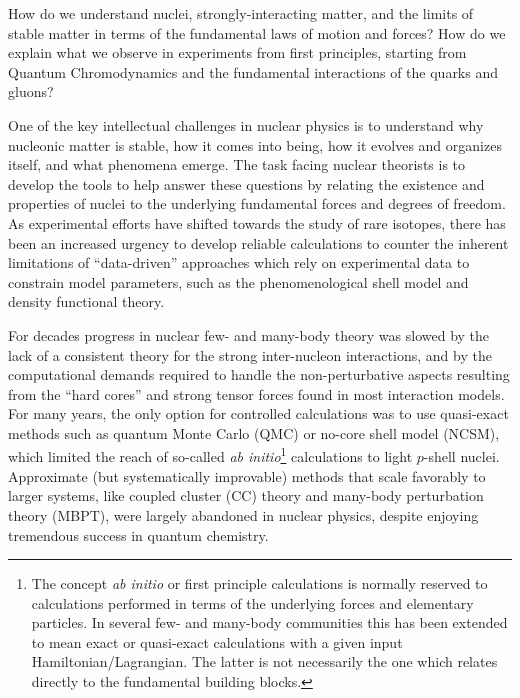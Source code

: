 \documentclass[10pt]{article}
\begin{document}
How do we understand nuclei, strongly-interacting matter, and the limits of
stable matter in terms of the fundamental laws of motion and
forces?  How do we explain what we observe in experiments from first principles,
starting from Quantum Chromodynamics and the fundamental interactions of the quarks and gluons?

One of the key intellectual challenges in nuclear physics is to understand
why nucleonic matter is stable, how it comes into being, how it
evolves and organizes itself, and what phenomena emerge. The task
facing nuclear theorists is to develop the tools to help answer these
questions by relating the existence and properties of nuclei to the
underlying fundamental forces and degrees of freedom. As experimental
efforts have shifted towards the study of rare
isotopes, there
has been an increased urgency to develop reliable 
calculations to counter the inherent limitations of ``data-driven''
approaches which rely on experimental data to constrain model
parameters, such as the phenomenological shell model and density
functional theory. 

For decades progress in nuclear few- and many-body theory was slowed
by the lack of a consistent theory for the strong inter-nucleon
interactions, and by the computational demands required to handle the
non-perturbative aspects resulting from the ``hard cores'' and strong
tensor forces found in most interaction models.  For many years, the
only option for controlled calculations was to use quasi-exact methods
such as quantum Monte Carlo (QMC) or no-core shell model (NCSM), which
limited the reach of so-called \emph{ab initio}\footnote{The concept
  \emph{ab initio} or first principle calculations is normally
  reserved to calculations performed in terms of the underlying forces
  and elementary particles. In several few- and many-body communities
  this has been extended to mean exact or quasi-exact calculations
  with a given input Hamiltonian/Lagrangian. The latter is not
  necessarily the one which relates directly to the fundamental
  building blocks.} calculations to light $p$-shell nuclei. Approximate
(but systematically improvable) methods that scale favorably to larger
systems, like coupled cluster (CC) theory and many-body perturbation
theory (MBPT), were largely abandoned in nuclear physics, despite
enjoying tremendous success in quantum chemistry.
\end{document}
